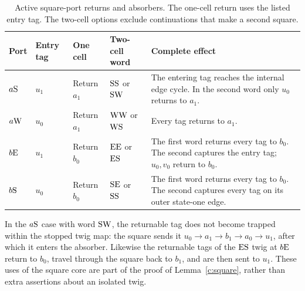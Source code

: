 \begin{table}[htbp]
\centering\small
\begin{tabularx}{\textwidth}{llllX}
\toprule
Port & Entry tag & One cell & Two-cell word & Complete effect \\
\midrule
\(a\mathrm{S}\)&\(u_1\)&Return \(a_1\)&\(\mathrm{S}\mathrm{S}\) or \(\mathrm{S}\mathrm{W}\)&
The entering tag reaches the internal edge cycle. In the second word only
\(u_0\) returns to \(a_1\).\\
\addlinespace
\(a\mathrm{W}\)&\(u_0\)&Return \(a_1\)&\(\mathrm{W}\mathrm{W}\) or \(\mathrm{W}\mathrm{S}\)&
Every tag returns to \(a_1\).\\
\addlinespace
\(b\mathrm{E}\)&\(u_1\)&Return \(b_0\)&\(\mathrm{E}\mathrm{E}\) or \(\mathrm{E}\mathrm{S}\)&
The first word returns every tag to \(b_0\). The second captures the
entry tag; \(u_0,v_0\) return to \(b_0\).\\
\addlinespace
\(b\mathrm{S}\)&\(u_0\)&Return \(b_0\)&\(\mathrm{S}\mathrm{E}\) or \(\mathrm{S}\mathrm{S}\)&
The first word returns every tag to \(b_0\). The second captures every
tag on its outer state-one edge.\\
\bottomrule
\end{tabularx}
\caption{Active square-port returns and absorbers. The one-cell return
uses the listed entry tag. The two-cell options exclude continuations
that make a second square.}
\label{c:active-ports}
\end{table}

In the \(a\mathrm{S}\) case with word \(\mathrm{S}\mathrm{W}\), the returnable tag
does not become trapped within the stopped twig map: the square sends it
\(u_0\to a_1\to b_1\to a_0\to u_1\), after which it enters the
absorber. Likewise the returnable tags of the \(\mathrm{E}\mathrm{S}\) twig at
\(b\mathrm{E}\) return to \(b_0\), travel through the square back to
\(b_1\), and are then sent to \(u_1\). These uses of the square core
are part of the proof of Lemma~\ref{c:square}, rather than extra assertions
about an isolated twig.
